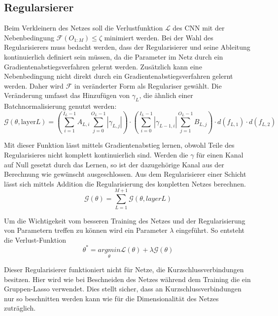 \subsection{Regularsierer}
Beim Verkleinern des Netzes soll die Verlustfunktion $\mathcal{L}$ des CNN mit der Nebenbedingung $\mathcal{F}(O_{1:M})\leq \zeta$ minimiert werden. Bei der Wahl des Regularisierers muss bedacht werden, dass der Regularisierer und seine Ableitung kontinuierlich definiert sein müssen, da die Parameter im Netz durch ein Gradientenabstiegsverfahren gelernt werden. Zusätzlich kann eine Nebenbedingung nicht direkt durch ein Gradientenabstiegsverfahren gelernt werden. Daher wird $\mathcal{F}$ in veränderter Form als Regulariser gewählt. Die Veränderung umfasst das Hinzufügen von $\gamma_L$, die ähnlich einer Batchnormalisierung genutzt werden:
\begin{equation}
\mathcal{G}(\theta, \text{layer} L)=\left(\sum_{i=1}^{I_L-1} A_{L,i} \sum_{j=0}^{O_{L}-1} |\gamma_{L,j} | \right) \cdot \left(\sum_{i=0}^{I_{L}-1} |\gamma_{L-1,i} |   \sum_{j=1}^{O_L-1} B_{L,j}\right) \cdot d(f_{L,1}) \cdot d(f_{L,2})  
\end{equation}

Mit dieser Funktion lässt mittels Gradientenabstieg lernen, obwohl Teile des Regularisieres nicht komplett kontinuierlich sind. Werden die $\gamma$ für einen Kanal auf Null gesetzt durch das Lernen, so ist der dazugehörige Kanal aus der Berechnung wie gewünscht ausgeschlossen. Aus dem Regularisierer einer Schicht lässt sich mittels Addition die Regularisierung des konpletten Netzes berechnen.
\begin{equation}
 \mathcal{G}(\theta)=\sum_{L=1}^{M+1} \mathcal{G}(\theta,layer L)
\end{equation}


Um die Wichtigekeit vom besseren Training des Netzes und der Regularisierung von Parametern treffen zu können wird ein Parameter $\lambda$ eingeführt. So entsteht die Verlust-Funktion
\begin{equation}
 \theta^{\ast}=\underset{\theta}{arg min} \mathcal{L}(\theta) + \lambda \mathcal{G}(\theta)
\end{equation}



Dieser Regularisierer funktioniert nicht für Netze, die Kurzschlussverbindungen besitzen. Hier wird wie bei Beschneiden des Netzes während dem Training die ein Gruppen-Lasso verwendet. Dies stellt sicher, dass an Kurzschlussverbindungen nur so beschnitten werden kann wie für die Dimensionalität des Netzes zuträglich.



